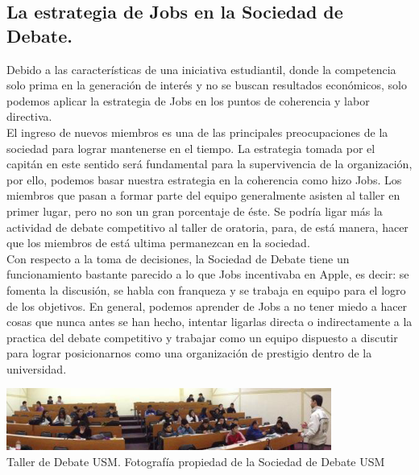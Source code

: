 \documentclass{article}
\begin{document}
\begin{adjustwidth}{-1.5cm}{-1.5cm}
	\section*{La estrategia de Jobs en la Sociedad de Debate.}
	Debido a las características de una iniciativa estudiantil, donde la competencia
	solo prima en la generación de interés y no se buscan resultados económicos,
	solo podemos aplicar la estrategia de Jobs en los puntos de coherencia y labor
	directiva.\\
	El ingreso de nuevos miembros es una de las principales preocupaciones de la
	sociedad para lograr mantenerse en el tiempo. La estrategia tomada por el
	capitán en este sentido será fundamental para la supervivencia de la organización,
	por ello, podemos basar nuestra estrategia en la coherencia como hizo Jobs.
	Los miembros que pasan a formar parte del equipo generalmente asisten
	al taller en primer lugar, pero no son un gran porcentaje de éste. Se podría
	ligar más la actividad de debate competitivo al taller de oratoria, para, de
	está manera, hacer que los miembros de está ultima permanezcan en la sociedad.\\
	Con respecto a la toma de decisiones, la Sociedad de Debate tiene un
	funcionamiento bastante parecido a lo que Jobs incentivaba en Apple, es decir:
	se fomenta la discusión, se habla con franqueza y se trabaja en equipo para
	el logro de los objetivos. 
	En general, podemos aprender de Jobs a no tener miedo a hacer cosas que nunca
	antes se han hecho, intentar ligarlas directa o indirectamente a la practica
	del debate competitivo y trabajar como un equipo dispuesto a discutir para
	lograr posicionarnos como una organización de prestigio dentro de la universidad.
	\begin{center}
		\includegraphics[width=0.8\textwidth]{sala.png}\\
		Taller de Debate USM. Fotografía propiedad de la Sociedad de Debate USM
	\end{center}


\end{adjustwidth}
\end{document}
